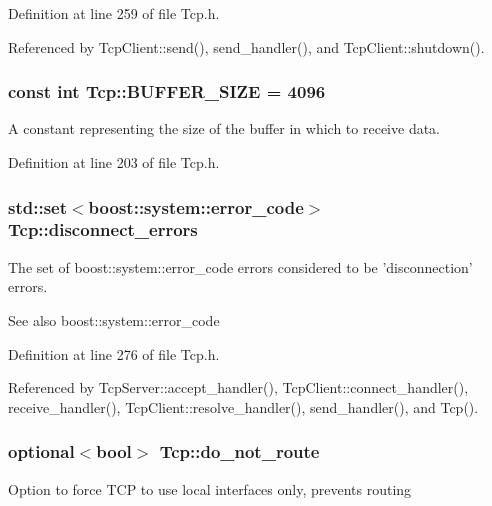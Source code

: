 Definition at line 259 of file Tcp.h.



Referenced by TcpClient::send(), send\_\-handler(), and TcpClient::shutdown().

\hypertarget{classTcp_a9302fa700d80ca1aed86e41e02925051}{
\subsubsection[{BUFFER\_\-SIZE}]{\setlength{\rightskip}{0pt plus 5cm}const int {\bf Tcp::BUFFER\_\-SIZE} = 4096}}
\label{classTcp_a9302fa700d80ca1aed86e41e02925051}
A constant representing the size of the buffer in which to receive data. 

Definition at line 203 of file Tcp.h.

\hypertarget{classTcp_adcbc3e86d98f8ba37247674cf67f77fd}{
\subsubsection[{disconnect\_\-errors}]{\setlength{\rightskip}{0pt plus 5cm}std::set$<$boost::system::error\_\-code$>$ {\bf Tcp::disconnect\_\-errors}}}
\label{classTcp_adcbc3e86d98f8ba37247674cf67f77fd}
The set of {\ttfamily boost::system::error\_\-code} errors considered to be 'disconnection' errors.

\begin{DoxySeeAlso}{See also}
boost::system::error\_\-code 
\end{DoxySeeAlso}


Definition at line 276 of file Tcp.h.



Referenced by TcpServer::accept\_\-handler(), TcpClient::connect\_\-handler(), receive\_\-handler(), TcpClient::resolve\_\-handler(), send\_\-handler(), and Tcp().

\hypertarget{classTcp_a6bff7fed84126b745930da36030c68c7}{
\subsubsection[{do\_\-not\_\-route}]{\setlength{\rightskip}{0pt plus 5cm}optional$<$bool$>$ {\bf Tcp::do\_\-not\_\-route}}}
\label{classTcp_a6bff7fed84126b745930da36030c68c7}
Option to force TCP to use local interfaces only, prevents routing 

